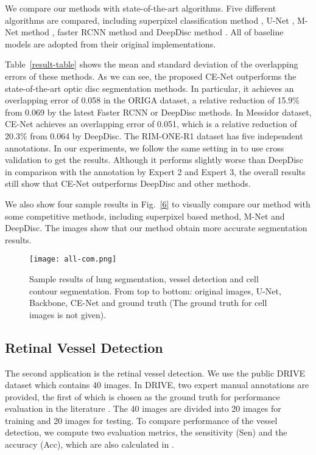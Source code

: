 \documentclass[journal]{IEEEtran}
\begin{document}
We compare our methods with state-of-the-art algorithms. Five different algorithms are compared, including superpixel classification method \cite{cheng2013superpixel}, U-Net \cite{ronneberger2015u}, M-Net method \cite{fu2018joint}, faster RCNN  method \cite{ren2017faster} and DeepDisc method \cite{gu2018deepdisc}.  All of baseline models are adopted from their original implementations.

Table~\ref{result-table} shows the mean and standard deviation of the overlapping errors of these methods. As we can see, the proposed CE-Net outperforms the state-of-the-art optic disc segmentation methods.
In particular, it achieves an overlapping error of 0.058 in the ORIGA dataset, a relative reduction of 15.9\% from 0.069 by the latest Faster RCNN or DeepDisc methods. 
 In Messidor dataset, CE-Net achieves an overlapping error of 0.051, which is a relative reduction of  20.3\% from   0.064 by DeepDisc. The RIM-ONE-R1 dataset has five independent annotations. In our experiments, we follow the same setting in \cite{li2018learning} to use cross validation to get the results. Although it performs slightly worse than DeepDisc in comparison  with the annotation by Expert 2 and Expert 3, the overall results still show that CE-Net outperforms DeepDisc and other methods.  

We also show four sample results in Fig.~\ref{6} to visually compare our method with some competitive methods,  including superpixel based method, M-Net and DeepDisc. The images show that our method  obtain more accurate segmentation results. 

\begin{figure*}[ht]
	\centering
	\texttt{[image: all-com.png]}\vspace{-.11cm}
	\caption{Sample results of lung segmentation, vessel detection and cell contour segmentation. From top to bottom: original  images, U-Net, Backbone, CE-Net and ground truth (The ground truth for cell images is not given).  } 
	\label{all-comparison}\vspace{-.25cm}
\end{figure*}




\subsection{Retinal Vessel Detection}
The second application is the retinal vessel detection.
We use the public  DRIVE \cite{staal2004ridge} dataset which contains 40 images.  In DRIVE, two expert manual annotations are provided, the first of which is chosen as the ground truth for performance evaluation in the literature \cite{fu2016deepvessel}. The 40 images are divided into 20 images for training and 20 images for testing.   
To compare performance of the vessel detection, we compute two evaluation metrics, the sensitivity (Sen) and the accuracy (Acc), which are also calculated in \cite{fu2016deepvessel} \cite{liskowski2016segmenting}.
\end{document}
